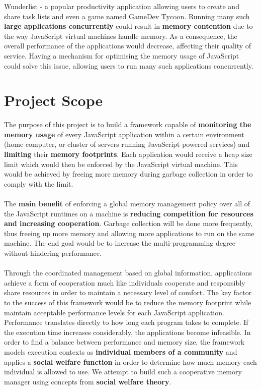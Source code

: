 \documentclass{l4proj}
\begin{document}
Wunderlist - a popular productivity application allowing users to create and share task lists\cite{wunderlist} and even a game named GameDev Tycoon\cite{tycoongame}. Running many such \textbf{large applications concurrently} could result in \textbf{memory contention} due to the way JavaScript virtual machines handle memory. As a consequence, the overall performance of the applications would decrease, affecting their quality of service. Having a mechanism for optimising the memory usage of JavaScript could solve this issue, allowing users to run many such applications concurrently.%

\section{Project Scope}
\hspace*{1em} The purpose of this project is to build a framework capable of \textbf{monitoring the memory usage} of every JavaScript application within a certain environment (home computer, or cluster of servers running JavaScript powered services) and \textbf{limiting} their \textbf{memory footprints}. Each application would receive a heap size limit which would then be enforced by the JavaScript virtual machine. This would be achieved by freeing more memory during garbage collection in order to comply with the limit. %
\\\\ %
\hspace*{1em} The \textbf{main benefit} of enforcing a global memory management policy over all of the JavaScript runtimes on a machine is \textbf{reducing competition for resources and increasing cooperation}. Garbage collection will be done more frequently, thus freeing up more memory and allowing more applications to run on the same machine. The end goal would be to increase the multi-programming degree without hindering performance.\\\\ %
\hspace*{1em} Through the coordinated management based on global information, applications achieve a form of cooperation much like individuals cooperate and responsibly share resources in order to maintain a necessary level of comfort. The key factor to the success of this framework would be to reduce the memory footprint while maintain acceptable performance levels for each JavaScript application. Performance translates directly to how long each program takes to complete. If the execution time increases considerably, the applications become infeasible. In order to find a balance between performance and memory size, the framework models execution contexts as \textbf{individual members of a community} and applies a \textbf{social welfare function} in order to determine how much memory each individual is allowed to use. We attempt to build such a cooperative memory manager using concepts from \textbf{social welfare theory}.
\end{document}
